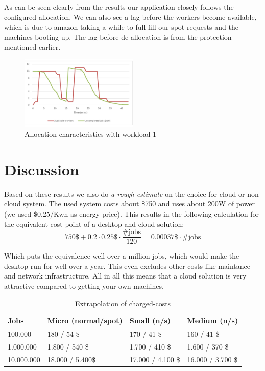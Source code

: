 \documentclass[a4paper]{IEEEtran}
\begin{document}
As can be seen clearly from the results our application closely follows the configured allocation. We can also see a lag before the workers become available, which is due to amazon taking a while to full-fill our spot requests and the machines booting up. The lag before de-allocation is from the protection mentioned earlier.

\begin{figure}
\centering
\includegraphics[width=0.5\textwidth]{"results-allocation-2"}
\caption{Allocation characteristics with workload 1}
\label{fig_tesperfresults}
\end{figure}
 

\section{Discussion}

Based on these results we also do \emph{a rough estimate} on the choice for cloud or non-cloud system. The used system costs about \$750 and uses about 200W of power (we used \$0.25/Kwh as energy price). This results in the following calculation for the equivalent cost point of a desktop and cloud solution:
$$
750\$ + 0.2 \cdot 0.25\$ \cdot \frac{\text{\#jobs}}{120} = 0.00037\$ \cdot \text{\#jobs}
$$

Which puts the equivalence well over a million jobs, which would make the desktop run for well over a year. This even excludes other costs like maintance and network infrastructure. All in all this means that a cloud solution is very attractive compared to getting your own machines.

	\begin{table}
	\caption{Extrapolation of charged-costs}
	\label{extpcosts}
	\centering
	\begin{tabular}{| l | l | l | l |}
	\hline
	Jobs & Micro (normal/spot) & Small (n/s) & Medium (n/s)\\ \hline
	100.000 &  180 / 54 \$ & 170 / 41 \$ &  160 / 41 \$ \\ \hline
	1.000.000 &  1.800 / 540 \$ & 1.700 / 410 \$ &  1.600 / 370 \$ \\ \hline
	10.000.000 &  18.000 / 5.400\$ & 17.000 / 4.100 \$ & 16.000 / 3.700 \$ \\ \hline
	\end{tabular}
	\end{table}	
	
\end{document}
